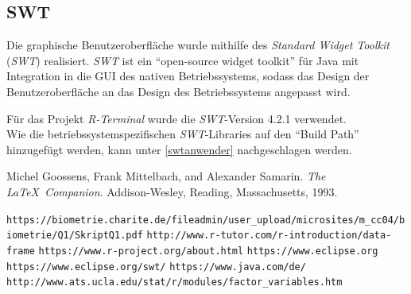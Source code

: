 \documentclass[a4paper, 12pt]{report} %
\begin{document}
\subsection{SWT}\label{swt} 
Die graphische Benutzeroberfläche wurde mithilfe des \textit{Standard Widget Toolkit} (\textit{SWT}) realisiert. \textit{SWT} ist ein "`open-source widget toolkit"' für Java mit Integration in die GUI des nativen Betriebssystems, sodass das Design der Benutzeroberfläche an das Design des Betriebssystems angepasst wird. 

Für das Projekt \textit{R-Terminal} wurde die \textit{SWT}-Version 4.2.1 verwendet.\\

Wie die betriebssystemspezifischen \textit{SWT}-Libraries auf den "`Build Path"' hinzugefügt werden, kann unter \ref{swtanwender} nachgeschlagen werden.




%

%
\begin{thebibliography}{9} %
Michel Goossens, Frank Mittelbach, and Alexander Samarin. 
\textit{The \LaTeX\ Companion}. 
Addison-Wesley, Reading, Massachusetts, 1993.
 


\texttt{https://biometrie.charite.de/fileadmin/user\_upload/microsites/m\_cc04/biometrie/Q1/SkriptQ1.pdf}
\texttt{http://www.r-tutor.com/r-introduction/data-frame}
\texttt{https://www.r-project.org/about.html}
\texttt{https://www.eclipse.org}
\texttt{https://www.eclipse.org/swt/}
\texttt{https://www.java.com/de/}
\texttt{http://www.ats.ucla.edu/stat/r/modules/factor\_variables.htm}

\end{thebibliography}
\end{document}
